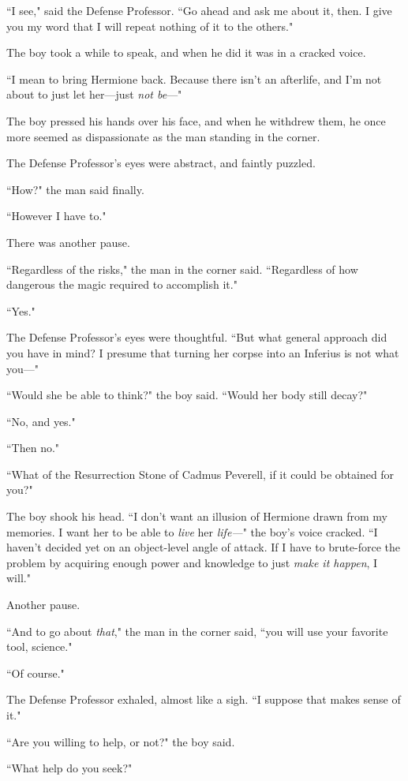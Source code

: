 ``I see," said the Defense Professor. ``Go ahead and ask me about it, then. I give you my word that I will repeat nothing of it to the others."

The boy took a while to speak, and when he did it was in a cracked voice.

``I mean to bring Hermione back. Because there isn't an afterlife, and I'm not about to just let her---just \emph{not be}---"

The boy pressed his hands over his face, and when he withdrew them, he once more seemed as dispassionate as the man standing in the corner.

The Defense Professor's eyes were abstract, and faintly puzzled.

``How?" the man said finally.

``However I have to."

There was another pause.

``Regardless of the risks," the man in the corner said. ``Regardless of how dangerous the magic required to accomplish it."

``Yes."

The Defense Professor's eyes were thoughtful. ``But what general approach did you have in mind? I presume that turning her corpse into an Inferius is not what you---"

``Would she be able to think?" the boy said. ``Would her body still decay?"

``No, and yes."

``Then no."

``What of the Resurrection Stone of Cadmus Peverell, if it could be obtained for you?"

The boy shook his head. ``I don't want an illusion of Hermione drawn from my memories. I want her to be able to \emph{live} her \emph{life---}" the boy's voice cracked. ``I haven't decided yet on an object-level angle of attack. If I have to brute-force the problem by acquiring enough power and knowledge to just \emph{make it happen}, I will."

Another pause.

``And to go about \emph{that}," the man in the corner said, ``you will use your favorite tool, science."

``Of course."

The Defense Professor exhaled, almost like a sigh. ``I suppose that makes sense of it."

``Are you willing to help, or not?" the boy said.

``What help do you seek?"

